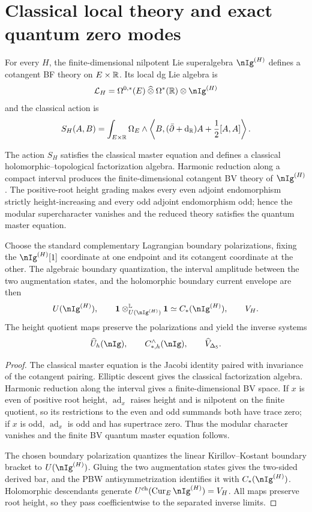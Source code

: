 \section{Classical local theory and exact quantum zero modes}
For every $H$, the finite-dimensional nilpotent Lie superalgebra $\nIg^{(H)}$ defines a cotangent BF theory on $E\times\mathbb R$.  Its local dg Lie algebra is
\[
 \Lcal_H=\Omega^{0,*}(E)\widehattensor\Omega^*(\R)\tensor\nIg^{(H)}
\]
and the classical action is
\[
 S_H(A,B)=\int_{E\times\mathbb R}\Omega_E\wedge
 \left\langle B,(\bar\partial+\mathrm d_{\mathbb R})A+\frac12[A,A]\right\rangle .
\]

\begin{theorem}
The action $S_H$ satisfies the classical master equation and defines a classical holomorphic--topological factorization algebra.  Harmonic reduction along a compact interval produces the finite-dimensional cotangent BV theory of $\nIg^{(H)}$.  The positive-root height grading makes every even adjoint endomorphism strictly height-increasing and every odd adjoint endomorphism odd; hence the modular supercharacter vanishes and the reduced theory satisfies the quantum master equation.

Choose the standard complementary Lagrangian boundary polarizations, fixing the $\nIg^{(H)}[1]$ coordinate at one endpoint and its cotangent coordinate at the other.  The algebraic boundary quantization, the interval amplitude between the two augmentation states, and the holomorphic boundary current envelope are then
\[
 U(\nIg^{(H)}),\qquad
 \mathbbm1\tensor^{\mathbb L}_{U(\nIg^{(H)})}\mathbbm1
 \simeq C_*(\nIg^{(H)}),\qquad V_H.
\]
The height quotient maps preserve the polarizations and yield the inverse systems
\[
 \widehat U_h(\nIg),\qquad
 C_{*,h}^{\wedge}(\nIg),\qquad
 \widehat V_{\Delta_5}.
\]
\end{theorem}
\begin{proof}
The classical master equation is the Jacobi identity paired with invariance of the cotangent pairing.  Elliptic descent gives the classical factorization algebra.  Harmonic reduction along the interval gives a finite-dimensional BV space.  If $x$ is even of positive root height, $\operatorname{ad}_x$ raises height and is nilpotent on the finite quotient, so its restrictions to the even and odd summands both have trace zero; if $x$ is odd, $\operatorname{ad}_x$ is odd and has supertrace zero.  Thus the modular character vanishes and the finite BV quantum master equation follows.

The chosen boundary polarization quantizes the linear Kirillov--Kostant boundary bracket to $U(\nIg^{(H)})$.  Gluing the two augmentation states gives the two-sided derived bar, and the PBW antisymmetrization identifies it with $C_*(\nIg^{(H)})$.  Holomorphic descendants generate $U^{\mathrm{ch}}(\operatorname{Cur}_E\nIg^{(H)})=V_H$.  All maps preserve root height, so they pass coefficientwise to the separated inverse limits.
\end{proof}

